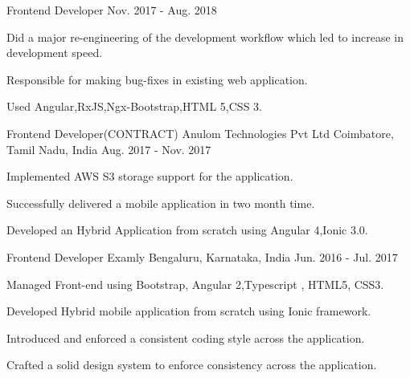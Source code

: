 \begin{cventries}
  \cventry
    {Frontend Developer}
    {}
    {}
    {Nov. 2017 - Aug. 2018}
    {
      \begin{cvitems}
        \item {Did a major re-engineering of the development workflow which led to
        increase in development speed.}
        \item {Responsible for making bug-fixes in existing web application.}
        \item {Used Angular,RxJS,Ngx-Bootstrap,HTML 5,CSS 3.}
        \end{cvitems}
    }

    
  \cventry
    {Frontend Developer(CONTRACT)}
    {Anulom Technologies Pvt Ltd}
    {Coimbatore, Tamil Nadu, India}
    {Aug. 2017 - Nov. 2017}
    {
      \begin{cvitems}
        \item { Implemented AWS S3 storage support for the application.}
        \item { Successfully delivered a mobile application in two month time.}    
        \item { Developed an Hybrid Application from scratch using Angular 4,Ionic 3.0.}
        \end{cvitems}
    }

  \cventry
    {Frontend Developer}
    {Examly}
    {Bengaluru, Karnataka, India}
    {Jun. 2016 - Jul. 2017}
    {
      \begin{cvitems}
        \item {Managed Front-end using Bootstrap, Angular 2,Typescript , HTML5, CSS3.}
        \item {Developed Hybrid mobile application from scratch using Ionic framework.}
        \item {Introduced and enforced a consistent coding style across the application.}
        \item {Crafted a solid design system to enforce consistency across the application.}
      \end{cvitems}
    }


\end{cventries}
